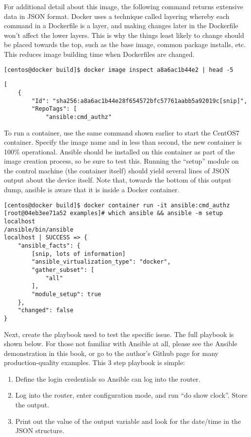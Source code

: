 For additional detail about this image, the following command returns
extensive data in JSON format. Docker uses a technique called layering whereby
each command in a Dockerfile is a layer, and making changes later in the
Dockerfile won't affect the lower layers. This is why the things least likely
to change should be placed towards the top, such as the base image, common
package installs, etc. This reduces image building time when Dockerfiles are
changed.

\begin{verbatim}
[centos@docker build]$ docker image inspect a8a6ac1b44e2 | head -5
\end{verbatim}
\begin{verbatim}
[
    {
        "Id": "sha256:a8a6ac1b44e28f654572bfc57761aabb5a92019c[snip]",
        "RepoTags": [
            "ansible:cmd_authz"
\end{verbatim}

To run a container, use the same command shown earlier to start the CentOS7
container. Specify the image name and in less than second, the new container
is 100\% operational. Ansible should be installed on this container as part of
the image creation process, so be sure to test this. Running the ``setup''
module on the control machine (the container itself) should yield several
lines of JSON output about the device itself. Note that, towards the bottom of
this output dump, ansible is aware that it is inside a Docker container.

\begin{verbatim}
[centos@docker build]$ docker container run -it ansible:cmd_authz
[root@04eb3ee71a52 examples]# which ansible && ansible -m setup localhost 
/ansible/bin/ansible
localhost | SUCCESS => {
    "ansible_facts": {
        [snip, lots of information]
        "ansible_virtualization_type": "docker", 
        "gather_subset": [
            "all"
        ], 
        "module_setup": true
    }, 
    "changed": false
}
\end{verbatim}

Next, create the playbook used to test the specific issue. The full playbook
is shown below. For those not familiar with Ansible at all, please see the
Ansible demonstration in this book, or go to the author's Github page for many
production-quality examples. This 3 step playbook is simple:

\begin{enumerate}
  \item Define the login credentials so Ansible can log into the router.
  \item Log into the router, enter configuration mode, and run ``do show
  clock''. Store the output.
  \item	Print out the value of the output variable and look for the date/time
  in the JSON structure.
\end{enumerate}

